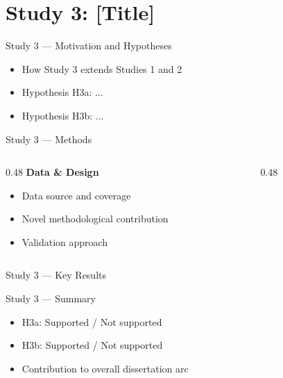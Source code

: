 \documentclass[aspectratio=169,11pt]{beamer}
\begin{document}
\section{Study 3: [Title]}

\begin{frame}{Study 3 — Motivation and Hypotheses}
  \begin{itemize}
    \item How Study 3 extends Studies 1 and 2
    \item Hypothesis H3a: ...
    \item Hypothesis H3b: ...
  \end{itemize}
\end{frame}

\begin{frame}{Study 3 — Methods}
  \begin{columns}[T]
    \begin{column}{0.48\textwidth}
      \textbf{Data \& Design}
      \begin{itemize}
        \item Data source and coverage
        \item Novel methodological contribution
        \item Validation approach
      \end{itemize}
    \end{column}
    \begin{column}{0.48\textwidth}
    \end{column}
  \end{columns}
\end{frame}

\begin{frame}{Study 3 — Key Results}
  \begin{center}
  \end{center}
\end{frame}

\begin{frame}{Study 3 — Summary}
  \begin{itemize}
    \item H3a: Supported / Not supported
    \item H3b: Supported / Not supported
    \item Contribution to overall dissertation arc
  \end{itemize}
\end{frame}
\end{document}
